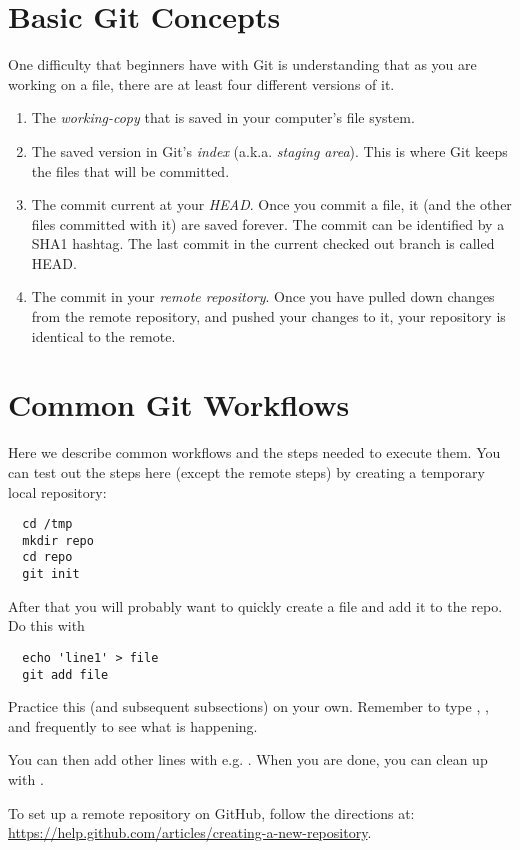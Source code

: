 \section{Basic Git Concepts}
\label{git:concepts}
One difficulty that beginners have with Git is understanding that as you are working on a file, there are at least four different versions of it.
\begin{enumerate}
  \item The \emph{working-copy} that is saved in your computer's file system.
  \item The saved version in Git's \emph{index} (a.k.a. \emph{staging area}).  This is where Git keeps the files that will be committed.
  \item The commit current at your \emph{HEAD}.  Once you commit a file, it (and the other files committed with it) are saved forever.  The commit can be identified by a SHA1 hashtag.  The last commit in the current checked out branch is called HEAD.
  \item The commit in your \emph{remote repository}.  Once you have pulled down changes from the remote repository, and pushed your changes to it, your repository is identical to the remote.
\end{enumerate}



\section{Common Git Workflows}
\label{git:workflows}
Here we describe common workflows and the steps needed to execute them.  You can test out the steps here (except the remote steps) by creating a temporary local repository:

\begin{verbatim}
  cd /tmp
  mkdir repo
  cd repo
  git init
\end{verbatim}
After that you will probably want to quickly create a file and add it to the repo.  Do this with
\begin{verbatim}
  echo 'line1' > file
  git add file
\end{verbatim}
Practice this (and subsequent subsections) on your own.  Remember to type , , and  frequently to see what is happening.

You can then add other lines with e.g. .  When you are done, you can clean up with .

To set up a remote repository on GitHub, follow the directions at: \url{https://help.github.com/articles/creating-a-new-repository}.

